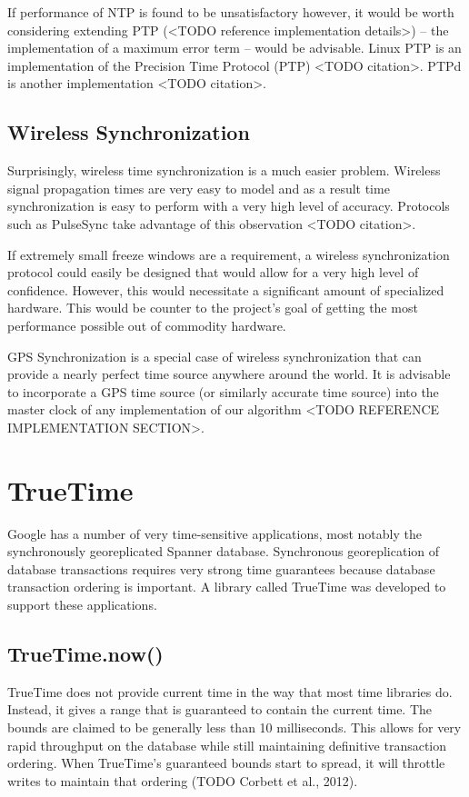 If performance of NTP is found to be unsatisfactory however, it would
be worth considering extending PTP (<TODO reference implementation
details>) -- the implementation of a maximum error term -- would be
advisable. Linux PTP is an implementation of the Precision Time
Protocol (PTP) <TODO citation>. PTPd is another implementation <TODO
citation>.

\subsection{Wireless Synchronization}

Surprisingly, wireless time synchronization is a much easier
problem. Wireless signal propagation times are very easy to model and
as a result time synchronization is easy to perform with a very high
level of accuracy. Protocols such as PulseSync take advantage of this
observation <TODO citation>.

If extremely small freeze windows are a requirement, a wireless
synchronization protocol could easily be designed that would allow for
a very high level of confidence. However, this would necessitate a
significant amount of specialized hardware. This would be counter to
the project’s goal of getting the most performance possible out of
commodity hardware.

GPS Synchronization is a special case of wireless synchronization that
can provide a nearly perfect time source anywhere around the world. It
is advisable to incorporate a GPS time source (or similarly accurate
time source) into the master clock of any implementation of our
algorithm <TODO REFERENCE IMPLEMENTATION SECTION>.

\section{TrueTime}

Google has a number of very time-sensitive applications, most notably
the synchronously georeplicated Spanner database. Synchronous
georeplication of database transactions requires very strong time
guarantees because database transaction ordering is important. A
library called TrueTime was developed to support these applications.

\subsection{TrueTime.now()}

TrueTime does not provide current time in the way that most time
libraries do. Instead, it gives a range that is guaranteed to contain
the current time. The bounds are claimed to be generally less than 10
milliseconds. This allows for very rapid throughput on the database
while still maintaining definitive transaction ordering. When
TrueTime’s guaranteed bounds start to spread, it will throttle writes
to maintain that ordering (TODO Corbett et al., 2012).


